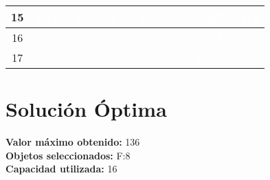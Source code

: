 \documentclass{article}
\begin{document}
\begin{center}
\begin{tabular}{|c|c|c|c|c|c|c|c|}
15 & \cellcolor{verde}\textcolor{white}{16(1)} & \cellcolor{rojo}\textcolor{white}{16} & \cellcolor{rojo}\textcolor{white}{16} & \cellcolor{rojo}\textcolor{white}{16} & \cellcolor{rojo}\textcolor{white}{16} & \cellcolor{verde}\textcolor{white}{119(7)} & \cellcolor{rojo}\textcolor{white}{119} \\ \hline
16 & \cellcolor{verde}\textcolor{white}{16(1)} & \cellcolor{rojo}\textcolor{white}{16} & \cellcolor{verde}\textcolor{white}{20(2)} & \cellcolor{rojo}\textcolor{white}{20} & \cellcolor{rojo}\textcolor{white}{20} & \cellcolor{verde}\textcolor{white}{136(8)} & \cellcolor{rojo}\textcolor{white}{136} \\ \hline
17 & \cellcolor{verde}\textcolor{white}{16(1)} & \cellcolor{rojo}\textcolor{white}{16} & \cellcolor{verde}\textcolor{white}{20(2)} & \cellcolor{verde}\textcolor{white}{21(1)} & \cellcolor{rojo}\textcolor{white}{21} & \cellcolor{verde}\textcolor{white}{136(8)} & \cellcolor{rojo}\textcolor{white}{136} \\ \hline
\end{tabular}
\end{center}
\normalsize

\section*{Solución Óptima}
\textbf{Valor máximo obtenido:} 136\\
\textbf{Objetos seleccionados:} F:8\\
\textbf{Capacidad utilizada:} 16\\
\end{document}
